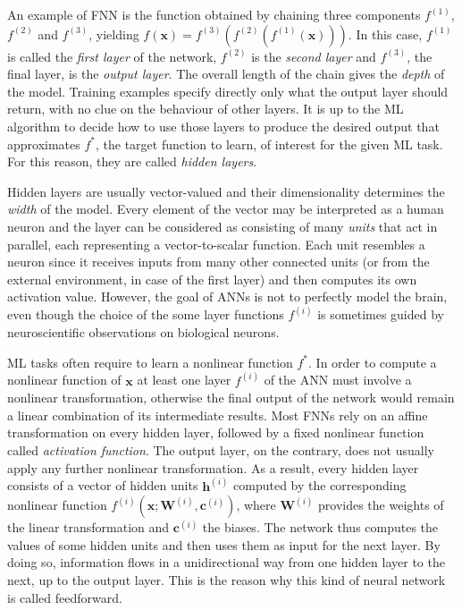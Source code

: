 An example of FNN is the function obtained by chaining three components $f^{(1)}$, $f^{(2)}$ and $f^{(3)}$, yielding $f(\bm{x}) = f^{(3)}(f^{(2)}(f^{(1)}(\bm{x})))$. In this case, $f^{(1)}$ is called the \textit{first layer} of the network, $f^{(2)}$ is the \textit{second layer} and $f^{(3)}$, the final layer, is the \textit{output layer}. The overall length of the chain gives the \textit{depth} of the model. Training examples specify directly only what the output layer should return, with no clue on the behaviour of other layers. It is up to the ML algorithm to decide how to use those layers to produce the desired output that approximates $f^*$, the target function to learn, of interest for the given ML task. For this reason, they are called \textit{hidden layers}. 

Hidden layers are usually vector-valued and their dimensionality determines the \textit{width} of the model. Every element of the vector may be interpreted as a human neuron and the layer can be considered as consisting of many \textit{units} that act in parallel, each representing a vector-to-scalar function. Each unit resembles a neuron since it receives inputs from many other connected units (or from the external environment, in case of the first layer) and then computes its own activation value. However, the goal of ANNs is not to perfectly model the brain, even though the choice of the some layer functions $f^{(i)}$ is sometimes guided by neuroscientific observations on biological neurons.

ML tasks often require to learn a nonlinear function $f^*$. In order to compute a nonlinear function of $\bm{x}$ at least one layer $f^{(i)}$ of the ANN must involve a nonlinear transformation, otherwise the final output of the network would remain a linear combination of its intermediate results. Most FNNs rely on an affine transformation on every hidden layer, followed by a fixed nonlinear function called \textit{activation function}. The output layer, on the contrary, does not usually apply any further nonlinear transformation. As a result, every hidden layer consists of a vector of hidden units $\bm{h}^{(i)}$ computed by the corresponding nonlinear function $f^{(i)}(\bm{x}; \bm{W}^{(i)}, \bm{c}^{(i)})$, where $\bm{W}^{(i)}$ provides the weights of the linear transformation and $\bm{c}^{(i)}$ the biases. The network thus computes the values of some hidden units and then uses them as input for the next layer. By doing so, information flows in a unidirectional way from one hidden layer to the next, up to the output layer. This is the reason why this kind of neural network is called feedforward.

